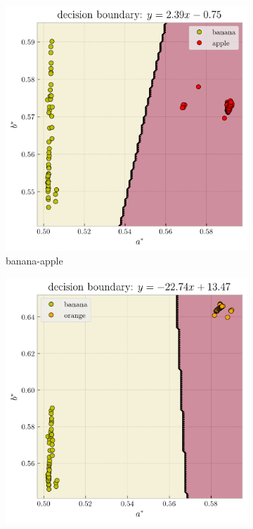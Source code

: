 \documentclass[12pt,a4paper]{article}
\begin{document}
\begin{figure}[htb]
	\centering
	\begin{subfigure}[h!]{0.3\textwidth}
		\centering
		\includegraphics[width=\textwidth]{ban-app_decision.png}
		\caption{banana-apple}
		\label{fig:banana-apple}
	\end{subfigure}
	\begin{subfigure}[h!]{0.3\textwidth}
		\centering
		\includegraphics[width=\textwidth]{ban-ora_decision.png}

\end{subfigure}
\end{figure}
\end{document}
